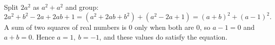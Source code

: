 Split $2a^2$ as $a^2+a^2$ and group:
\[2a^2+b^2-2a+2ab+1=(a^2+2ab+b^2)+(a^2-2a+1)=(a+b)^2+(a-1)^2 .\]
A sum of two squares of real numbers is $0$ only when both are $0$, so $a-1=0$ and $a+b=0$. Hence $\boxed{a=1,\ b=-1}$, and these values do satisfy the equation.
